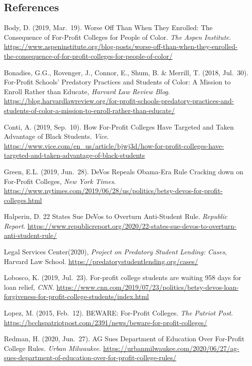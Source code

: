 \documentclass[
]{article}
\begin{document}
\hypertarget{references}{%
\subsection{\texorpdfstring{\textbf{References}}{References}}\label{references}}

Body, D. (2019, Mar.~19). Worse Off Than When They Enrolled: The
Consequence of For-Profit Colleges for People of Color. \emph{The Aspen
Institute}.
\url{https://www.aspeninstitute.org/blog-posts/worse-off-than-when-they-enrolled-the-consequence-of-for-profit-colleges-for-people-of-color/}

Bonadies, G.G., Rovenger, J., Connor, E., Shum, B. \& Merrill, T. (2018,
Jul.~30). For-Profit Schools' Predatory Practices and Students of Color:
A Mission to Enroll Rather than Educate, \emph{Harvard Law Review Blog}.
\url{https://blog.harvardlawreview.org/for-profit-schools-predatory-practices-and-students-of-color-a-mission-to-enroll-rather-than-educate/}

Conti, A. (2019, Sep.~10). How For-Profit Colleges Have Targeted and
Taken Advantage of Black Students. \emph{Vice}.
\url{https://www.vice.com/en_us/article/bjwj3d/how-for-profit-colleges-have-targeted-and-taken-advantage-of-black-students}

Green, E.L. (2019, Jun.~28). DeVos Repeals Obama-Era Rule Cracking down
on For-Profit Colleges, \emph{New York Times}.
\url{https://www.nytimes.com/2019/06/28/us/politics/betsy-devos-for-profit-colleges.html}

Halperin, D. 22 States Sue DeVos to Overturn Anti-Student Rule.
\emph{Republic Report}.
\url{https://www.republicreport.org/2020/22-states-sue-devos-to-overturn-anti-student-rule/}

Legal Services Center(2020), \emph{Project on Predatory Student Lending:
Cases}, Harvard Law School.
\url{https://predatorystudentlending.org/cases/}

Lobosco, K. (2019, Jul.~23). For-profit college students are waiting 958
days for loan relief, \emph{CNN}.
\url{https://www.cnn.com/2019/07/23/politics/betsy-devos-loan-forgiveness-for-profit-college-students/index.html}

Lopez, M. (2015, Feb.~12). BEWARE: For-Profit Colleges. \emph{The
Patriot Post}.
\url{https://bcchspatriotpost.com/2391/news/beware-for-profit-colleges/}

Redman, H. (2020, Jun.~27). AG Sues Department of Education Over
For-Profit College Rules. \emph{Urban Milwaukee}.
\url{https://urbanmilwaukee.com/2020/06/27/ag-sues-department-of-education-over-for-profit-college-rules/}
\end{document}
